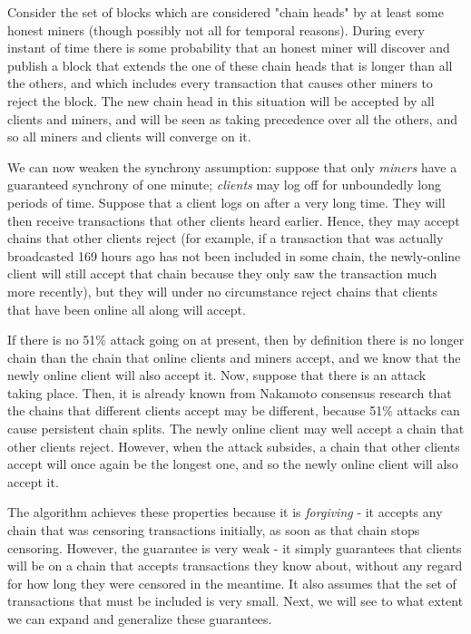 \documentclass[12pt]{article}
\begin{document}
Consider the set of blocks which are considered "chain heads" by at least some honest miners (though possibly not all for temporal reasons). During every instant of time there is some probability that an honest miner will discover and publish a block that extends the one of these chain heads that is longer than all the others, and which includes every transaction that causes other miners to reject the block. The new chain head in this situation will be accepted by all clients and miners, and will be seen as taking precedence over all the others, and so all miners and clients will converge on it.

We can now weaken the synchrony assumption: suppose that only \textit{miners} have a guaranteed synchrony of one minute; \textit{clients} may log off for unboundedly long periods of time. Suppose that a client logs on after a very long time. They will then receive transactions that other clients heard earlier. Hence, they may accept chains that other clients reject (for example, if a transaction that was actually broadcasted 169 hours ago has not been included in some chain, the newly-online client will still accept that chain because they only saw the transaction much more recently), but they will under no circumstance reject chains that clients that have been online all along will accept.

If there is no 51\% attack going on at present, then by definition there is no longer chain than the chain that online clients and miners accept, and we know that the newly online client will also accept it. Now, suppose that there is an attack taking place. Then, it is already known from Nakamoto consensus research that the chains that different clients accept may be different, because 51\% attacks can cause persistent chain splits. The newly online client may well accept a chain that other clients reject. However, when the attack subsides, a chain that other clients accept will once again be the longest one, and so the newly online client will also accept it.

The algorithm achieves these properties because it is \textit{forgiving} - it accepts any chain that was censoring transactions initially, as soon as that chain stops censoring. However, the guarantee is very weak - it simply guarantees that clients will be on a chain that accepts transactions they know about, without any regard for how long they were censored in the meantime. It also assumes that the set of transactions that must be included is very small. Next, we will see to what extent we can expand and generalize these guarantees.
\end{document}
